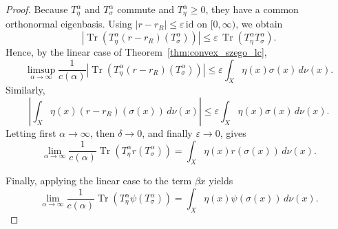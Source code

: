 \documentclass{amsart}
\theoremstyle{definition}
\theoremstyle{remark}
\numberwithin{equation}{section}
\begin{document}
\begin{proof}
Because $T_\eta^\alpha$ and $T_\sigma^\alpha$ commute and
$T_\eta^\alpha\geq0$, they have a common orthonormal eigenbasis.
Using $|r-r_R|\leq\varepsilon\,\mathrm{id}$ on $[0,\infty)$, we obtain
\[
\left|
\operatorname{Tr}\!\left(
T_\eta^\alpha(r-r_R)(T_\sigma^\alpha)
\right)
\right|
\leq
\varepsilon\,
\operatorname{Tr}\!\left(
T_\eta^\alpha T_\sigma^\alpha
\right).
\]
Hence, by the linear case of Theorem~\ref{thm:convex_szego_lc},
\[
\limsup_{\alpha\to\infty}
\frac{1}{c(\alpha)}
\left|
\operatorname{Tr}\!\left(
T_\eta^\alpha(r-r_R)(T_\sigma^\alpha)
\right)
\right|
\leq
\varepsilon\int_X\eta(x)\sigma(x)\,d\nu(x).
\]
Similarly,
\[
\left|
\int_X\eta(x)(r-r_R)(\sigma(x))\,d\nu(x)
\right|
\leq
\varepsilon\int_X\eta(x)\sigma(x)\,d\nu(x).
\]
Letting first $\alpha\to\infty$, then $\delta\to0$, and finally
$\varepsilon\to0$, gives
\[
\lim_{\alpha\to\infty}
\frac{1}{c(\alpha)}
\operatorname{Tr}\!\left(
T_\eta^\alpha r(T_\sigma^\alpha)
\right)
=
\int_X\eta(x)r(\sigma(x))\,d\nu(x).
\]

Finally, applying the linear case to the term $\beta x$ yields
\[
\lim_{\alpha\to\infty}
\frac{1}{c(\alpha)}
\operatorname{Tr}\!\left(
T_\eta^\alpha\psi(T_\sigma^\alpha)
\right)
=
\int_X\eta(x)\psi(\sigma(x))\,d\nu(x).
\]


\end{proof}



\end{document}
